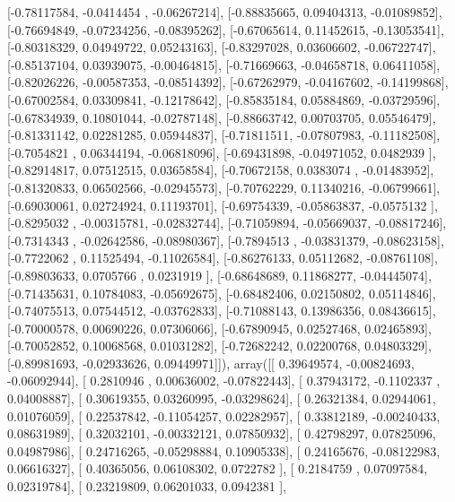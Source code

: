 \documentclass{article}
\begin{document}
       [-0.78117584, -0.0414454 , -0.06267214],
       [-0.88835665,  0.09404313, -0.01089852],
       [-0.76694849, -0.07234256, -0.08395262],
       [-0.67065614,  0.11452615, -0.13053541],
       [-0.80318329,  0.04949722,  0.05243163],
       [-0.83297028,  0.03606602, -0.06722747],
       [-0.85137104,  0.03939075, -0.00464815],
       [-0.71669663, -0.04658718,  0.06411058],
       [-0.82026226, -0.00587353, -0.08514392],
       [-0.67262979, -0.04167602, -0.14199868],
       [-0.67002584,  0.03309841, -0.12178642],
       [-0.85835184,  0.05884869, -0.03729596],
       [-0.67834939,  0.10801044, -0.02787148],
       [-0.88663742,  0.00703705,  0.05546479],
       [-0.81331142,  0.02281285,  0.05944837],
       [-0.71811511, -0.07807983, -0.11182508],
       [-0.7054821 ,  0.06344194, -0.06818096],
       [-0.69431898, -0.04971052,  0.0482939 ],
       [-0.82914817,  0.07512515,  0.03658584],
       [-0.70672158,  0.0383074 , -0.01483952],
       [-0.81320833,  0.06502566, -0.02945573],
       [-0.70762229,  0.11340216, -0.06799661],
       [-0.69030061,  0.02724924,  0.11193701],
       [-0.69754339, -0.05863837, -0.0575132 ],
       [-0.8295032 , -0.00315781, -0.02832744],
       [-0.71059894, -0.05669037, -0.08817246],
       [-0.7314343 , -0.02642586, -0.08980367],
       [-0.7894513 , -0.03831379, -0.08623158],
       [-0.7722062 ,  0.11525494, -0.11026584],
       [-0.86276133,  0.05112682, -0.08761108],
       [-0.89803633,  0.0705766 ,  0.0231919 ],
       [-0.68648689,  0.11868277, -0.04445074],
       [-0.71435631,  0.10784083, -0.05692675],
       [-0.68482406,  0.02150802,  0.05114846],
       [-0.74075513,  0.07544512, -0.03762833],
       [-0.71088143,  0.13986356,  0.08436615],
       [-0.70000578,  0.00690226,  0.07306066],
       [-0.67890945,  0.02527468,  0.02465893],
       [-0.70052852,  0.10068568,  0.01031282],
       [-0.72682242,  0.02200768,  0.04803329],
       [-0.89981693, -0.02933626,  0.09449971]]), array([[ 0.39649574, -0.00824693, -0.06092944],
       [ 0.2810946 ,  0.00636002, -0.07822443],
       [ 0.37943172, -0.1102337 ,  0.04008887],
       [ 0.30619355,  0.03260995, -0.03298624],
       [ 0.26321384,  0.02944061,  0.01076059],
       [ 0.22537842, -0.11054257,  0.02282957],
       [ 0.33812189, -0.00240433,  0.08631989],
       [ 0.32032101, -0.00332121,  0.07850932],
       [ 0.42798297,  0.07825096,  0.04987986],
       [ 0.24716265, -0.05298884,  0.10905338],
       [ 0.24165676, -0.08122983,  0.06616327],
       [ 0.40365056,  0.06108302,  0.0722782 ],
       [ 0.2184759 ,  0.07097584,  0.02319784],
       [ 0.23219809,  0.06201033,  0.0942381 ],
\end{document}
